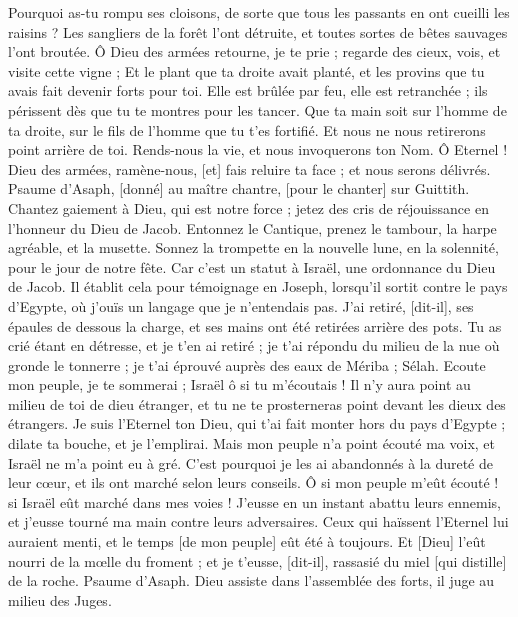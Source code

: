 \begin{multicols}{2}
Pourquoi as-tu rompu ses cloisons, de sorte que tous les passants en ont cueilli les raisins ?
Les sangliers de la forêt l'ont détruite, et toutes sortes de bêtes sauvages l'ont broutée.
Ô Dieu des armées retourne, je te prie ; regarde des cieux, vois, et visite cette vigne ;
Et le plant que ta droite avait planté, et les provins que tu avais fait devenir forts pour toi.
Elle est brûlée par feu, elle est retranchée ; ils périssent dès que tu te montres pour les tancer.
Que ta main soit sur l'homme de ta droite, sur le fils de l'homme que tu t'es fortifié.
Et nous ne nous retirerons point arrière de toi. Rends-nous la vie, et nous invoquerons ton Nom.
Ô Eternel ! Dieu des armées, ramène-nous, [et] fais reluire ta face ; et nous serons délivrés.
\VerseOne{}Psaume d'Asaph, [donné] au maître chantre, [pour le chanter] sur Guittith. Chantez gaiement à Dieu, qui est notre force ; jetez des cris de réjouissance en l'honneur du Dieu de Jacob.
Entonnez le Cantique, prenez le tambour, la harpe agréable, et la musette.
Sonnez la trompette en la nouvelle lune, en la solennité, pour le jour de notre fête.
Car c'est un statut à Israël, une ordonnance du Dieu de Jacob.
Il établit cela pour témoignage en Joseph, lorsqu'il sortit contre le pays d'Egypte, où j'ouïs un langage que je n'entendais pas.
J'ai retiré, [dit-il], ses épaules de dessous la charge, et ses mains ont été retirées arrière des pots.
Tu as crié étant en détresse, et je t'en ai retiré ; je t'ai répondu du milieu de la nue où gronde le tonnerre ; je t'ai éprouvé auprès des eaux de Mériba ; Sélah.
Ecoute mon peuple, je te sommerai ; Israël ô si tu m'écoutais !
Il n'y aura point au milieu de toi de dieu étranger, et tu ne te prosterneras point devant les dieux des étrangers.
Je suis l'Eternel ton Dieu, qui t'ai fait monter hors du pays d'Egypte ; dilate ta bouche, et je l'emplirai.
Mais mon peuple n'a point écouté ma voix, et Israël ne m'a point eu à gré.
C'est pourquoi je les ai abandonnés à la dureté de leur cœur, et ils ont marché selon leurs conseils.
Ô si mon peuple m'eût écouté ! si Israël eût marché dans mes voies !
J'eusse en un instant abattu leurs ennemis, et j'eusse tourné ma main contre leurs adversaires.
Ceux qui haïssent l'Eternel lui auraient menti, et le temps [de mon peuple] eût été à toujours.
Et [Dieu] l'eût nourri de la mœlle du froment ; et je t'eusse, [dit-il], rassasié du miel [qui distille] de la roche.
\VerseOne{}Psaume d'Asaph. Dieu assiste dans l'assemblée des forts, il juge au milieu des Juges.

\end{multicols}
